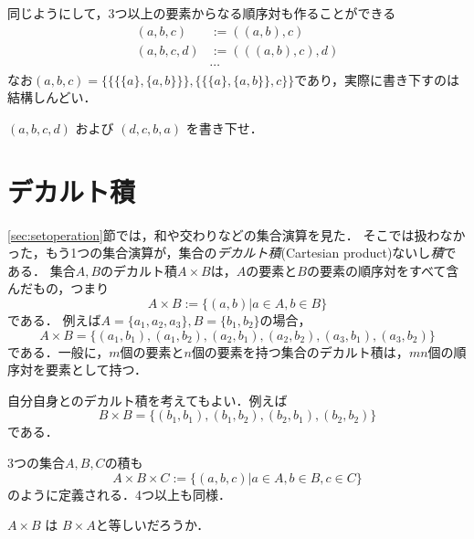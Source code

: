 \documentclass[11pt,a4paper]{jsarticle}
\begin{document}
同じようにして，3つ以上の要素からなる順序対も作ることができる
\begin{align*}
 (a, b, c) &:= ((a,b), c) \\
 (a, b, c, d) &:= (((a,b), c), d) \\
&\cdots
\end{align*}
なお$ (a, b, c) = \{\{\{\{a\}, \{a,b\}\}\}, \{\{\{a\}, \{a,b\}\}, c\}\}$であり，実際に書き下すのは結構しんどい．

\begin{exercise}
$(a,b,c,d)$ および $(d,c,b,a)$ を書き下せ．
\end{exercise} 

 
\section{デカルト積}
\ref{sec:setoperation}節では，和や交わりなどの集合演算を見た．
そこでは扱わなかった，もう1つの集合演算が，集合の\emph{デカルト積}(Cartesian product)ないし\emph{積}である．
集合$A, B$のデカルト積$A \times B$は，$A$の要素と$B$の要素の順序対をすべて含んだもの，つまり
\[
 A \times B := \{ (a, b) | a \in A, b \in B\}
\]
である．
例えば$A = \{a_1, a_2, a_3\}, B = \{b_1, b_2\}$の場合，
\[
A \times B = \{(a_1, b_1), (a_1, b_2), (a_2, b_1), (a_2, b_2), (a_3, b_1), (a_3, b_2)\}
\]
である．一般に，$m$個の要素と$n$個の要素を持つ集合のデカルト積は，$mn$個の順序対を要素として持つ．

自分自身とのデカルト積を考えてもよい．例えば
\[
B \times B = \{(b_1, b_1), (b_1, b_2), (b_2, b_1), (b_2, b_2)\}
\]
である．

3つの集合$A, B, C$の積も
\[
 A \times B \times C := \{ (a, b, c) | a \in A, b \in B, c \in C \}
\]
のように定義される．4つ以上も同様．


\begin{exercise}
$A \times B$ は $B \times A$と等しいだろうか．
\end{exercise} 

%



%
\end{document}
